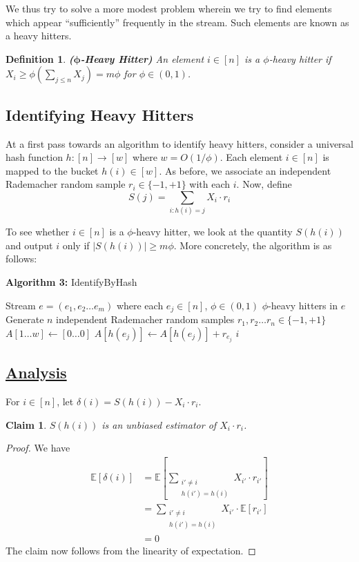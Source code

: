 \documentclass[11pt]{article}
\newtheorem{definition}{Definition}
\newtheorem{claim}{Claim}
\newcommand{\Expect}{\mathbb{E}}
\newcommand{\abs}[1]{\left| #1 \right|}
\begin{document}
\noindent We thus try to solve a more modest problem wherein we try to find  elements which appear ``sufficiently'' frequently in the stream. Such elements are known as a heavy hitters. \\

\begin{definition}
	\emph{\textbf{($\bm{\phi}$-Heavy Hitter)}}
	An element $i \in [n]$ is a $\phi$-heavy hitter if $X_i \geq \phi \left(\sum_{j \leq n} X_j\right) = m \phi$ for $\phi \in (0, 1)$.
\end{definition}

\subsection{Identifying Heavy Hitters}
At a first pass towards an algorithm to identify heavy hitters, consider a universal hash function $h : [n] \to [w]$ where $w = O(1 / \phi)$. Each element $i \in [n]$ is mapped to the bucket $h(i) \in [w]$. As before, we associate an independent Rademacher random sample $r_i \in \{-1, +1\}$ with each $i$. Now, define
\[
	S(j) = \sum_{i : h(i) = j}X_i \cdot r_i
\]

\noindent To see whether $i \in [n]$ is a $\phi$-heavy hitter, we look at the quantity $S(h(i))$ and output $i$ only if $\abs{S(h(i))} \geq m \phi$. More concretely, the algorithm is as follows:
\begin{algorithm}[H]
	\caption*{\textbf{Algorithm 3:} \mbox{\sc IdentifyByHash}}
	\begin{algorithmic}[1]
		\Input  Stream $e = (e_1, e_2 \dots e_m)$ where each $e_j \in [n]$, $\phi \in (0, 1)$
		\Output $\phi$-heavy hitters in $e$ 
		\State Generate $n$ independent Rademacher random samples $r_1, r_2 \dots r_n \in \{-1, +1\}$ 
		\State $A[1 \dots w] \gets [0 \dots 0]$
		\State $A[h(e_j)] \gets A[h(e_j)] + r_{e_j}$
		\EndFor
			\If{$\abs{S(h(i))} \geq m \phi$}
				\OutputS $i$
			\EndIf
		\EndFor
	\end{algorithmic}
\end{algorithm}

\subsection*{\underline{Analysis}}
For $i \in [n]$, let $\delta(i) = S(h(i)) - X_i \cdot r_i$.

\begin{claim}
	$S(h(i))$ is an unbiased estimator of $X_i \cdot r_i$. 
\end{claim}
\begin{proof}
We have
\begin{align*}
\Expect[\delta(i)] &= \Expect \left[\sum_{\substack{i' \neq i \\h(i') = h(i)}} X_{i'} \cdot r_{i'}\right] \\[5pt]
&= \sum_{\substack{i' \neq i \\h(i') = h(i)}} X_{i'} \cdot \Expect[r_{i'}] \\[5pt]
&= 0
\end{align*}
The claim now follows from the linearity of expectation.
\end{proof}

\newpage	
\nocite{*}


\end{document}
